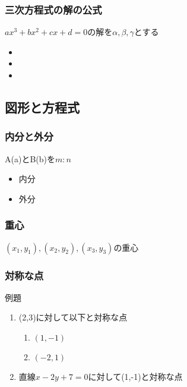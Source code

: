 \documentclass[10pt,dvipdfmx]{jsarticle}
\begin{document}
\subsubsection*{三次方程式の解の公式}
$ax^3+bx^2+cx+d=0$の解を$\alpha,\beta,\gamma$とする
\begin{multicols}{3}
  \begin{Large}
    \begin{itemize}
      \item \item \item
    \end{itemize}
  \end{Large}
\end{multicols}




\newpage
\subsection*{図形と方程式}
\subsubsection*{内分と外分}
A(a)とB(b)を$m:n$
\begin{multicols}{2}
  \begin{itemize}
    \item 内分
    \item 外分
  \end{itemize}
\end{multicols}

\subsubsection*{重心}
$(x_1,y_1), (x_2,y_2), (x_3,y_3)$の重心
\vspace{10mm}

\subsubsection*{対称な点}
\begin{itembox}[l]{例題}
  \begin{large}
    \begin{enumerate}
      \item (2,3)に対して以下と対称な点
            \begin{multicols}{2}
              \begin{enumerate}
                \item $(1,-1)$
                \item $(-2,1)$
              \end{enumerate}
            \end{multicols}
      \item 直線$x-2y+7=0$に対して(1,-1)と対称な点
    \end{enumerate}
  \end{large}
\end{itembox}
\end{document}
